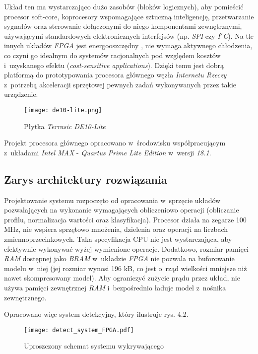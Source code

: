 Układ ten ma wystarczająco dużo zasobów (bloków logicznych), aby pomieścić procesor soft-core, koprocesory wspomagające sztuczną inteligencję, przetwarzanie sygnałów oraz sterowanie dołączonymi do niego komponentami zewnętrznymi, używającymi standardowych elektronicznych interfejsów (np. \textit{SPI} czy \textit{I$^2$C}). Na tle innych układów \textit{FPGA} jest energooszczędny \cite{Intel:MAX}, nie wymaga aktywnego chłodzenia, co czyni go idealnym do systemów racjonalnych pod względem kosztów i~uzyskanego efektu (\textit{cost-sensitive applications}). Dzięki temu jest dobrą platformą do prototypowania procesora głównego węzła \textit{Internetu Rzeczy} z~potrzebą akceleracji sprzętowej pewnych zadań wykonywanych przez takie urządzenie.

\begin{figure}[h]
	\centering
	\texttt{[image: de10-lite.png]}
	\caption{Płytka \textit{Terrasic DE10-Lite}}
\end{figure}
\FloatBarrier %

Projekt procesora głównego opracowano w~środowisku współpracującym z~układami \textit{Intel MAX} - \textit{Quartus Prime Lite Edition} w~wersji \textit{18.1}.

\subsection{Zarys architektury rozwiązania}

Projektowanie systemu rozpoczęto od opracowania w~sprzęcie układów pozwalających na wykonanie wymagających obliczeniowo operacji (obliczanie profilu, normalizacja wartości oraz klasyfikacja). Procesor działa na zegarze 100 MHz, nie wspiera sprzętowo mnożenia, dzielenia oraz operacji na liczbach zmiennoprzecinkowych. Taka specyfikacja CPU nie jest wystarczająca, aby efektywnie wykonywać wyżej wymienione operacje. Dodatkowo, rozmiar pamięci \textit{RAM} dostępnej jako \textit{BRAM} w~układzie \textit{FPGA} nie pozwala na buforowanie modelu w~niej (jej rozmiar wynosi 196 kB, co jest o~rząd wielkości mniejsze niż nawet skompresowany model). Aby ograniczyć zużycie prądu przez układ, nie używa pamięci zewnętrznej \textit{RAM} i~bezpośrednio ładuje model z~nośnika zewnętrznego.

Opracowano więc system detekcyjny, który ilustruje rys. 4.2.

\begin{figure}[h]
	\centering
	\texttt{[image: detect\_system\_FPGA.pdf]}
	\caption{Uproszczony schemat systemu wykrywającego}
\end{figure}
\FloatBarrier %

